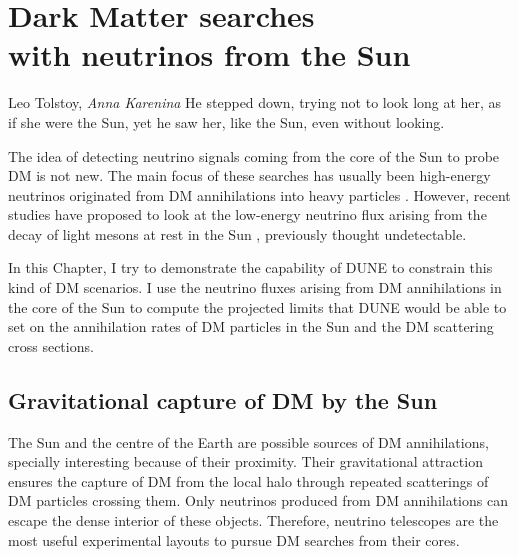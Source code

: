 \chapter[Dark Matter searches with neutrinos from the Sun]{Dark Matter searches\\ with neutrinos from the Sun}\label{chapter:dm_analysis}

\begin{chapquote}{Leo Tolstoy, \textit{Anna Karenina}}
	He stepped down, trying not to look long at her, as if she were the Sun, yet he saw her, like the Sun, even without looking.
\end{chapquote}

The idea of detecting neutrino signals coming from the core of the Sun to probe DM is not new. The main focus of these searches has usually been high-energy neutrinos originated from DM annihilations into heavy particles \cite{Silk1985, Srednicki1986, Hagelin1986, Gaisser1986}. However, recent studies have proposed to look at the low-energy neutrino flux arising from the decay of light mesons at rest in the Sun \cite{Bernal2012, Rott2012, Rott2015, DUNE2021}, previously thought undetectable.

%
In this Chapter, I try to demonstrate the capability of DUNE to constrain this kind of DM scenarios. I use the neutrino fluxes arising from DM annihilations in the core of the Sun to compute the projected limits that DUNE would be able to set on the annihilation rates of DM particles in the Sun and the DM scattering cross sections.

\section{Gravitational capture of DM by the Sun}
\label{sec:dm_analysis_theory}

The Sun and the centre of the Earth are possible sources of DM annihilations, specially interesting because of their proximity. Their gravitational attraction ensures the capture of DM from the local halo through repeated scatterings of DM particles crossing them. Only neutrinos produced from DM annihilations can escape the dense interior of these objects. Therefore, neutrino telescopes are the most useful experimental layouts to pursue DM searches from their cores.

